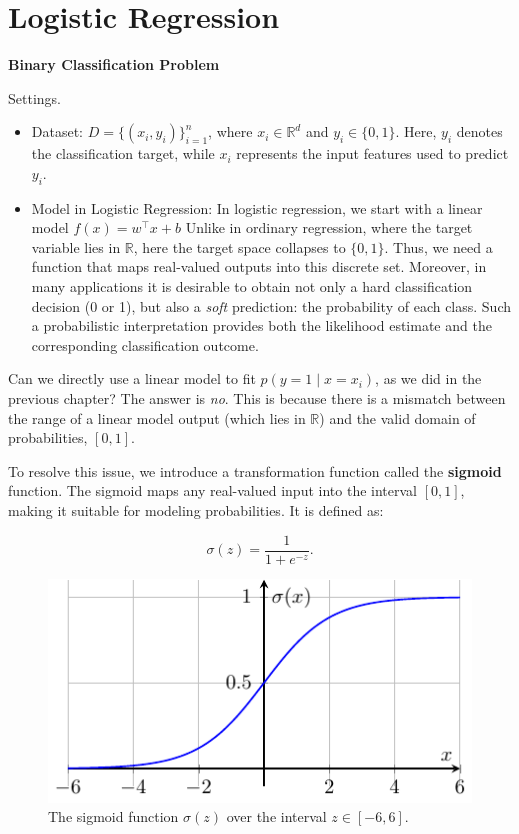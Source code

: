 \documentclass[../main]{subfiles}
\begin{document}
\chapter{Logistic Regression}
\begin{introduction}
\item 
\end{introduction}
\begin{example}
  \textbf{Binary Classification Problem}
\end{example}
Settings.
\begin{itemize}
  \item Dataset: $D=\{(x_i,y_i)\}_{i=1}^n$, where $x_i\in\mathbb{R}^d$ and $y_i\in\{0,1\}$.  
  Here, $y_i$ denotes the classification target, while $x_i$ represents the input features used to predict $y_i$.
  \item Model in Logistic Regression: In logistic regression, we start with a linear model $
  f(x) = w^\top x + b$
  Unlike in ordinary regression, where the target variable lies in $\mathbb{R}$, here the target space collapses to $\{0,1\}$. Thus, we need a function that maps real-valued outputs into this discrete set. Moreover, in many applications it is desirable to obtain not only a hard classification decision (0 or 1), but also a \emph{soft} prediction: the probability of each class. Such a probabilistic interpretation provides both the likelihood estimate and the corresponding classification outcome.
\end{itemize}
Can we directly use a linear model to fit $p(y=1 \mid x=x_i)$, as we did in the previous chapter? The answer is \emph{no}. This is because there is a mismatch between the range of a linear model output (which lies in $\mathbb{R}$) and the valid domain of probabilities, $[0,1]$. 

To resolve this issue, we introduce a transformation function called the \textbf{sigmoid} function. The sigmoid maps any real-valued input into the interval $[0,1]$, making it suitable for modeling probabilities. It is defined as:
\begin{definition}
  \begin{equation}
    \sigma(z) = \frac{1}{1 + e^{-z}} .
\end{equation}
\end{definition}

\begin{figure}[H]
  \centering
  \includegraphics{../../tikz/2/1.pdf}
  \caption{The sigmoid function $\sigma(z)$ over the interval $z \in [-6,6]$.}
\end{figure}
\end{document}
